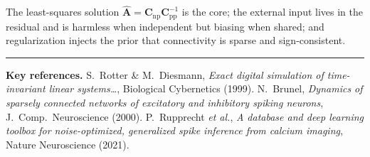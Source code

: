 \documentclass[11pt,a4paper]{article}
\newcommand{\Amat}{\mathbf{A}}
\begin{document}
The least-squares solution $\widehat{\Amat}=\mathbf{C}_{\text{np}}
\mathbf{C}_{\text{pp}}^{-1}$ is the core; the external input lives in the
residual and is harmless when independent but biasing when shared; and
regularization injects the prior that connectivity is sparse and sign-consistent.

\vspace{1em}
\hrule
\vspace{0.6em}
\small
\noindent\textbf{Key references.}
S.~Rotter \& M.~Diesmann, \emph{Exact digital simulation of time-invariant linear
systems\ldots}, Biological Cybernetics (1999).\;
N.~Brunel, \emph{Dynamics of sparsely connected networks of excitatory and
inhibitory spiking neurons}, J.\ Comp.\ Neuroscience (2000).\;
P.~Rupprecht \emph{et al.}, \emph{A database and deep learning toolbox for
noise-optimized, generalized spike inference from calcium imaging}, Nature
Neuroscience (2021).
\end{document}
